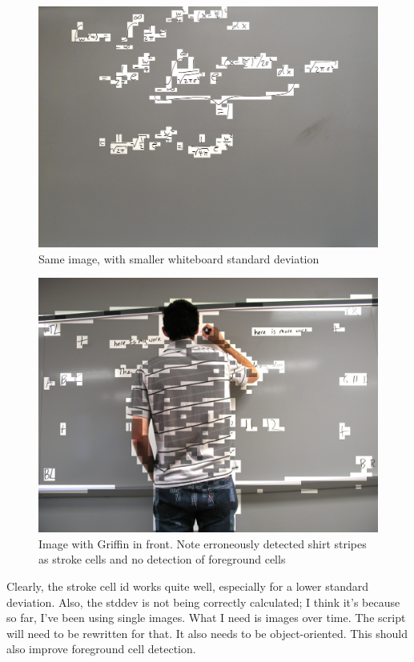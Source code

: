 \documentclass[]{article}
\begin{document}
\begin{figure}[H]
\centering
\includegraphics[scale=0.15]{images/cell_id_demo_61}
\caption{Same image, with smaller whiteboard standard deviation}
\end{figure}

\begin{figure}[H]
\centering
\includegraphics[scale=0.18]{images/cell_id_griffin}
\caption{Image with Griffin in front.  Note erroneously detected shirt stripes as stroke cells and no detection of foreground cells}
\end{figure}

Clearly, the stroke cell id works quite well, especially for a lower standard deviation.  Also, the stddev is not being correctly calculated;  I think it's because so far, I've been using single images.  What I need is images over time.  The script will need to be rewritten for that.  It also needs to be object-oriented.  This should also improve foreground cell detection.  
\end{document}
